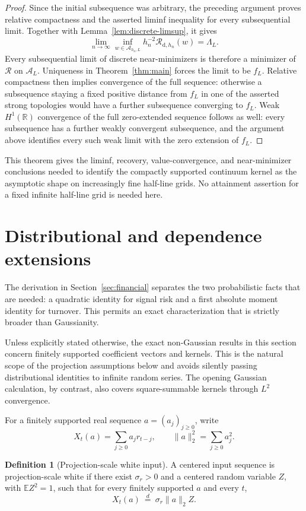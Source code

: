\documentclass[11pt]{article}
\theoremstyle{definition}
\newtheorem{definition}[theorem]{Definition}
\theoremstyle{remark}
\newcommand{\Rcal}{\mathcal R}
\begin{document}
\begin{proof}
Since the initial subsequence was arbitrary, the preceding argument proves
relative compactness and the asserted liminf inequality for every
subsequential limit. Together with Lemma~\ref{lem:discrete-limsup}, it gives
\[
 \lim_{n\to\infty}\inf_{w\in\mathcal A_{h_n,L}}
 h_n^{-2}\Rcal_{\mathrm d,h_n}(w)=\Lambda_L.
\]
Every subsequential limit of discrete near-minimizers is therefore a minimizer of
$\Rcal$ on $\mathcal A_L$. Uniqueness in Theorem~\ref{thm:main} forces the limit
to be $f_L$. Relative compactness then implies convergence of the full sequence:
otherwise a subsequence staying a fixed positive distance from $f_L$ in one of
the asserted strong topologies would have a further subsequence converging to
$f_L$. Weak $H^1(\mathbb R)$ convergence of the full zero-extended sequence
follows as well: every subsequence has a further weakly convergent subsequence,
and the argument above identifies every such weak limit with the zero extension
of $f_L$.
\end{proof}

This theorem gives the liminf, recovery, value-convergence, and near-minimizer
conclusions needed to identify the compactly supported continuum kernel as the
asymptotic shape on increasingly fine half-line grids. No attainment assertion
for a fixed infinite half-line grid is needed here.


\section{Distributional and dependence extensions}\label{app:extensions}
The derivation in Section~\ref{sec:financial} separates the two probabilistic facts
that are needed: a quadratic identity for signal risk and a first absolute
moment identity for turnover. This permits an exact characterization that is
strictly broader than Gaussianity.

Unless explicitly stated otherwise, the exact non-Gaussian results in this
section concern finitely supported coefficient vectors and kernels. This is
the natural scope of the projection assumptions below and avoids silently
passing distributional identities to infinite random series. The opening
Gaussian calculation, by contrast, also covers square-summable kernels through
$L^2$ convergence.

For a finitely supported real sequence $a=(a_j)_{j\geq0}$, write
\[
 X_t(a)=\sum_{j\geq0}a_jr_{t-j},
 \qquad \|a\|_2^2=\sum_{j\geq0}a_j^2.
\]

\begin{definition}[Projection-scale white input]\label{def:projection-scale}
A centered input sequence is projection-scale white if there exist
$\sigma_r>0$ and a centered random variable $Z$, with $\mathbb E Z^2=1$, such
that for every finitely supported $a$ and every $t$,
\begin{equation}\label{eq:projection-scale}
 X_t(a)\ \overset{d}=\ \sigma_r\|a\|_2 Z.
\end{equation}
\end{definition}
\end{document}
